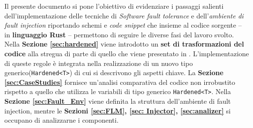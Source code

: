 \noindent 
Il presente documento si pone l'obiettivo di evidenziare i passaggi salienti dell'implementazione delle tecniche di \textit{Software fault tolerance} e dell'\textit{ambiente di fault injection} riportando schemi e \textit{code snippet}  che insieme al codice sorgente -- in \textbf{linguaggio Rust} -- permettono di seguire le diverse fasi del lavoro svolto.\\
Nella \textbf{Sezione \ref{sec:hardened}} viene introdotto un \textbf{set di trasformazioni del codice} alla stregua di parte di quello che viene presentato in \cite{rebaudengo1999soft}. L'implementazione di queste regole è integrata nella realizzazione di un nuovo tipo generico(\texttt{Hardened<T>}) di cui si descrivono gli aspetti chiave. La \textbf{Sezione \ref{sec:CaseStudies}} fornisce un'analisi comparativa del codice non irrobustito rispetto a quello che utilizza le variabili di tipo generico \texttt{Hardened<T>}. Nella \textbf{Sezione \ref{sec:Fault_Env}} viene definita la struttura dell'ambiente di fault injection, mentre le \textbf{Sezioni \ref{sec:FLM}, \ref{sec: Injector}, \ref{sec:analizer}} si occupano di analizzarne i componenti.
